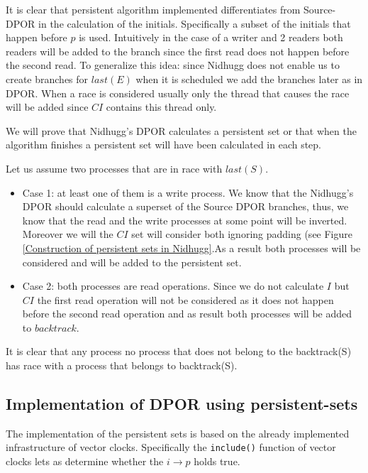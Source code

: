 It is clear that persistent algorithm implemented differentiates from Source-DPOR in the calculation of the initials. 
Specifically a subset of the initials that happen before $p$ is used. 
Intuitively in the case of a writer and 2 readers both readers will be added to the branch since the first read does not happen before the second read.
To generalize this idea: since Nidhugg does not enable us to create branches for $last(E)$ when it is scheduled we add the branches later as in DPOR. When
a race is considered usually only the thread that causes the race will be added since $CI$ contains this thread only.

We will prove that Nidhugg's DPOR calculates a persistent set or that when the algorithm finishes a persistent set will have been calculated in each step.

Let us assume two processes that are in race with $last(S)$.
\begin{itemize}

\item Case 1: at least one of them is a write process.
We know that the Nidhugg's DPOR should calculate a superset of the Source DPOR branches, thus, we know that the read and the write processes at some point
will be inverted. Moreover we will the $CI$ set will consider both ignoring padding (see Figure \ref{Construction of persistent sets in Nidhugg}.As a result both processes will be considered and will be added to the persistent set.


\item Case 2: both processes are read operations.
Since we do not calculate $I$ but $CI$ the first read operation will not be considered as it does not happen before the second read operation and as result
both processes will be added to $backtrack$. 

\end{itemize}
It is clear that any process no process that does not belong to the backtrack(S) has race with a process that belongs to backtrack(S).

\subsection{Implementation of DPOR using persistent-sets}

The implementation of the persistent sets is based on the already implemented infrastructure of vector clocks. Specifically the \verb|include()| function of vector clocks
lets as determine whether the $i \rightarrow p$ holds true.

